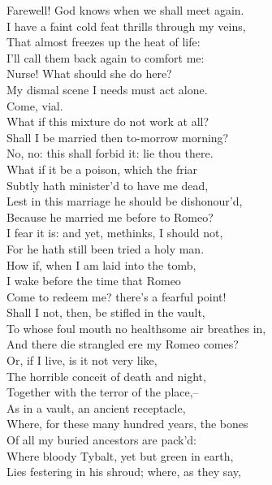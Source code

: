 \begin{speech}
Farewell!   God knows when we shall meet again. \\

I have a faint cold feat thrills through my veins, \\
That almost freezes up the heat of life: \\
I'll call them back again to comfort me: \\
Nurse!  What should she do here? \\
My dismal scene I needs must act alone. \\
Come, vial. \\
What if this mixture do not work at all? \\
Shall I be married then to-morrow morning? \\
No, no: this shall forbid it: lie thou there. 
\\
What if it be a poison, which the friar \\
Subtly hath minister'd to have me dead, \\
Lest in this marriage he should be dishonour'd, \\
Because he married me before to Romeo? \\
I fear it is: and yet, methinks, I should not, \\
For he hath still been tried a holy man. \\
How if, when I am laid into the tomb, \\
I wake before the time that Romeo \\
Come to redeem me? there's a fearful point! \\
Shall I not, then, be stifled in the vault, \\
To whose foul mouth no healthsome air breathes in, \\
And there die strangled ere my Romeo comes? \\
Or, if I live, is it not very like, \\
The horrible conceit of death and night, \\
Together with the terror of the place,-- \\
As in a vault, an ancient receptacle, \\
Where, for these many hundred years, the bones \\
Of all my buried ancestors are pack'd: \\
Where bloody Tybalt, yet but green in earth, \\
Lies festering in his shroud; where, as they say, \\

\end{speech}
